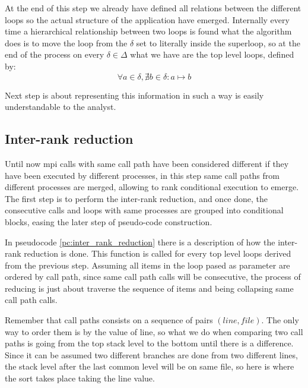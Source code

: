 At the end of this step we already have defined all relations between the
different loops so the actual structure of the application have emerged. 
Internally every time a hierarchical relationship between two loops is found
what the algorithm does is to move the loop from the $\delta$ set to literally
inside the superloop, so at the end of the process on every $\delta \in \Delta$
what we have are the top level loops, defined by:
\begin{equation}
    \label{eq:top_level_loops_de}
    \forall a \in \delta, \nexists b \in \delta: a \mapsto b
\end{equation}

Next step is about representing this information in such a way is easily
understandable to the analyst.

\subsection{Inter-rank reduction}

Until now mpi calls with same call path have been considered different if they 
have been executed by different processes, in this step same call paths from 
different processes are merged, allowing to rank conditional execution to
emerge. The first step is to perform the inter-rank reduction, and once done,
the consecutive calls and loops with same processes are grouped into conditional
blocks, easing the later step of pseudo-code construction.

In pseudocode \ref{pc:inter_rank_reduction} there is a description of how the
inter-rank reduction is done. This function is called for every top level loops
derived from the previous step. Assuming all items in the loop pased as
parameter are ordered by call path, since same call path calls will be
consecutive, the process of reducing is just about traverse the sequence of
items and being collapsing same call path calls.

Remember that call paths consists on a sequence of pairs $(line, file)$. The
only way to order them is by the value of line, so what we do when comparing two
call paths is going from the top stack level to the bottom until there is 
a difference. Since it can be assumed two different branches are done from two 
different lines, the stack level after the last common level will be on same 
file, so here is where the sort takes place taking the line value.

